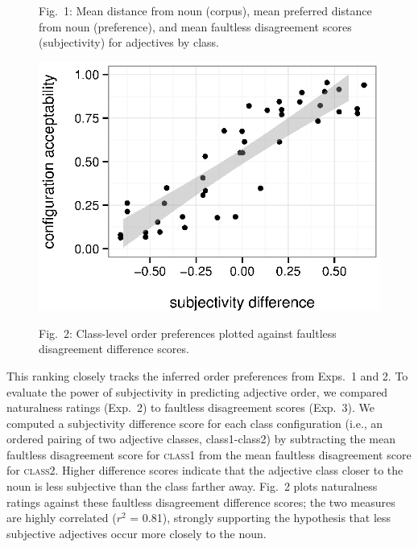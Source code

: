 \documentclass[12pt]{article}
\begin{document}
\begin{figure}
\begin{center}
	\end{center}
	\vspace{-15pt}
	Fig.~1: Mean distance from noun (corpus), mean preferred distance from noun  (preference), and mean faultless disagreement scores (subjectivity) for adjectives by class.
	\vspace{-12pt}
	\begin{center}
		\includegraphics[width=.85\linewidth]{plots/comparison2.eps}
	\end{center}
	\vspace{-10pt}
	Fig.~2: Class-level order preferences plotted against faultless disagreement difference scores.
\end{figure}

\noindent
This ranking closely tracks the inferred order preferences from Exps.~1 and 2.
To evaluate the power of subjectivity in predicting adjective order, we compared naturalness ratings (Exp.~2) to faultless disagreement scores (Exp.~3). We  computed a subjectivity difference score for each class configuration (i.e., an ordered pairing of two adjective classes, class1-class2) by subtracting the mean faultless disagreement score for \textsc{class1} from the mean faultless disagreement score for \textsc{class2}. Higher difference scores indicate that the adjective class closer to the noun is less subjective than the class farther away. Fig.~2 plots naturalness ratings  against these faultless disagreement difference scores; the two measures are highly correlated ($r^2$ = 0.81), strongly supporting the hypothesis that less subjective adjectives occur more closely to the noun.
\end{document}
